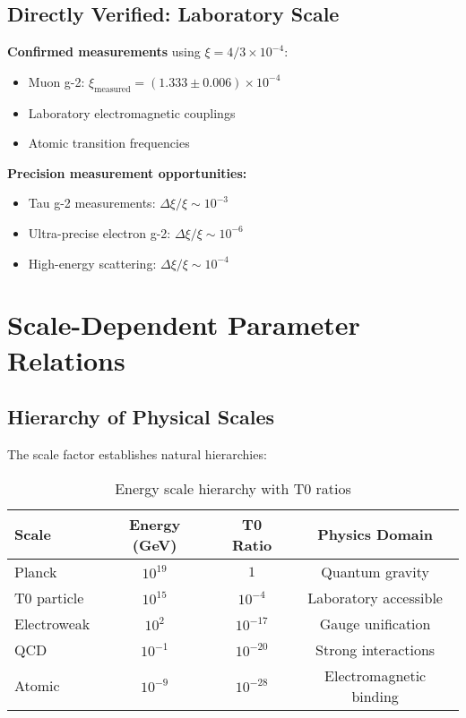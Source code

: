 \documentclass[12pt,a4paper]{report}
\begin{document}
\subsection{Directly Verified: Laboratory Scale}
\label{subsec:directly_verified}

\textbf{Confirmed measurements} using $\xi = 4/3 \times 10^{-4}$:
\begin{itemize}
	\item Muon g-2: $\xi_{\text{measured}} = (1.333 \pm 0.006) \times 10^{-4}$ \checkmark
	\item Laboratory electromagnetic couplings \checkmark
	\item Atomic transition frequencies \checkmark
\end{itemize}

\textbf{Precision measurement opportunities:}
\begin{itemize}
	\item Tau g-2 measurements: $\Delta\xi/\xi \sim 10^{-3}$
	\item Ultra-precise electron g-2: $\Delta\xi/\xi \sim 10^{-6}$
	\item High-energy scattering: $\Delta\xi/\xi \sim 10^{-4}$
\end{itemize}

\section{Scale-Dependent Parameter Relations}
\label{sec:scale_dependent}

\subsection{Hierarchy of Physical Scales}
\label{subsec:hierarchy_scales}

The scale factor establishes natural hierarchies:

\begin{table}[htbp]
	\centering
	\begin{tabular}{lccc}
		\toprule
		\textbf{Scale} & \textbf{Energy (GeV)} & \textbf{T0 Ratio} & \textbf{Physics Domain} \\
		\midrule
		Planck & $10^{19}$ & $1$ & Quantum gravity \\
		T0 particle & $10^{15}$ & $10^{-4}$ & Laboratory accessible \\
		Electroweak & $10^{2}$ & $10^{-17}$ & Gauge unification \\
		QCD & $10^{-1}$ & $10^{-20}$ & Strong interactions \\
		Atomic & $10^{-9}$ & $10^{-28}$ & Electromagnetic binding \\
		\bottomrule
	\end{tabular}
	\caption{Energy scale hierarchy with T0 ratios}
	\label{tab:energy_hierarchy}
\end{table}
\end{document}
